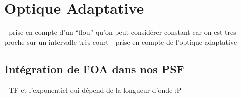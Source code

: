 \section{Optique Adaptative}

- prise en compte d’un “flou” qu’on peut considérer constant car on est tres proche sur un intervalle très court
- prise en compte de l’optique adaptative

\subsection{Intégration de l’OA dans nos PSF}

- TF et l’exponentiel qui dépend de la longueur d’onde :P